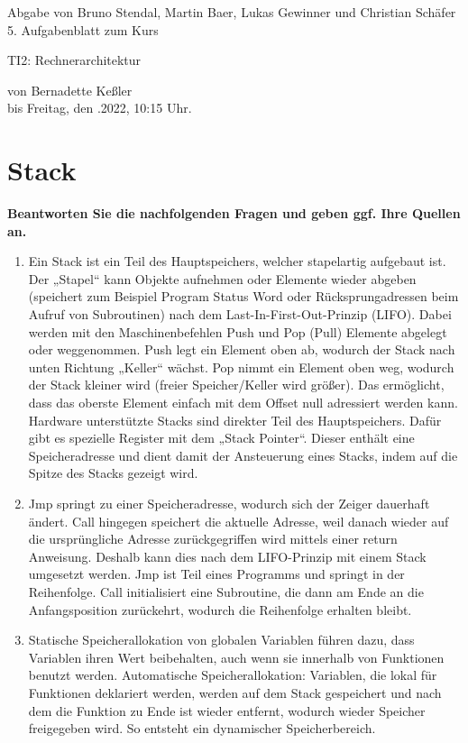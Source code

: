 \documentclass[11pt]{article}
\newcommand{\VORLESUNG}{TI2: Rechnerarchitektur}
\newcommand{\STUDENTS}{Bruno Stendal, Martin Baer, Lukas Gewinner und Christian Schäfer}
\newcommand{\STAFF}{Bernadette Keßler}
\newcommand{\ASSIGNMENT}{5}
\newcommand{\DELIVER}{Freitag, den .2022, 10:15 Uhr}
\newcommand{\aufgabe}[1]{\item{\bf #1}}
\begin{document}
\ofoot{\pagemark}
\begin{center}
    Abgabe von \STUDENTS{}\\
 \ASSIGNMENT{}. Aufgabenblatt  zum Kurs 
\vspace*{0.2cm}

{\Large \VORLESUNG{}}

{\small von \STAFF{} \\ bis \DELIVER{}.}
\vspace*{0.5cm}\\
\end{center}
\section{Stack}
\aufgabe{Beantworten Sie die nachfolgenden Fragen und geben ggf. Ihre Quellen an.}
\begin{enumerate}
    \item Ein Stack ist ein Teil des Hauptspeichers, welcher stapelartig aufgebaut ist. Der „Stapel“ kann Objekte aufnehmen oder Elemente wieder abgeben (speichert zum Beispiel Program Status Word oder Rücksprungadressen beim Aufruf von Subroutinen) nach dem Last-In-First-Out-Prinzip (LIFO). Dabei werden mit den Maschinenbefehlen Push und Pop (Pull) Elemente abgelegt oder weggenommen. Push legt ein Element oben ab, wodurch der Stack nach unten Richtung „Keller“ wächst. Pop nimmt ein Element oben weg, wodurch der Stack kleiner wird (freier Speicher/Keller wird größer). Das ermöglicht, dass das oberste Element einfach mit dem Offset null adressiert werden kann. Hardware unterstützte Stacks sind direkter Teil des Hauptspeichers. Dafür gibt es spezielle Register mit dem „Stack Pointer“. Dieser enthält eine Speicheradresse und dient damit der Ansteuerung eines Stacks, indem auf die Spitze des Stacks gezeigt wird.
    \item Jmp springt zu einer Speicheradresse, wodurch sich der Zeiger dauerhaft ändert. Call hingegen speichert die aktuelle Adresse, weil danach wieder auf die ursprüngliche Adresse zurückgegriffen wird mittels einer return Anweisung. Deshalb kann dies nach dem LIFO-Prinzip mit einem Stack umgesetzt werden. Jmp ist Teil eines Programms und springt in der Reihenfolge. Call initialisiert eine Subroutine, die dann am Ende an die Anfangsposition zurückehrt, wodurch die Reihenfolge erhalten bleibt.
    \item Statische Speicherallokation von globalen Variablen führen dazu, dass Variablen ihren Wert beibehalten, auch wenn sie innerhalb von Funktionen benutzt werden. Automatische Speicherallokation: Variablen, die lokal für Funktionen deklariert werden, werden auf dem Stack gespeichert und nach dem die Funktion zu Ende ist wieder entfernt, wodurch wieder Speicher freigegeben wird. So entsteht ein dynamischer Speicherbereich.

\end{enumerate}
\end{document}
